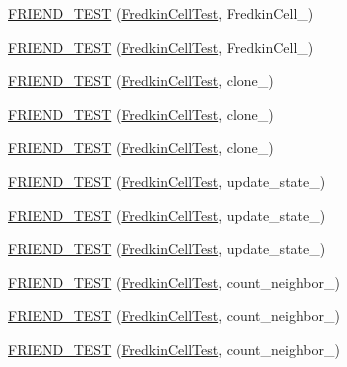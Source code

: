 \begin{DoxyCompactItemize}
\item 
\hyperlink{classFredkinCell_a909e7a7909a653da223ed24b3904273e}{F\-R\-I\-E\-N\-D\-\_\-\-T\-E\-S\-T} (\hyperlink{classFredkinCell_aef267ce10e0a76047d409a41033eea05}{Fredkin\-Cell\-Test}, Fredkin\-Cell\-\_)
\item 
\hyperlink{classFredkinCell_a1dd337d9a2ce520930532f1e68fa50a8}{F\-R\-I\-E\-N\-D\-\_\-\-T\-E\-S\-T} (\hyperlink{classFredkinCell_aef267ce10e0a76047d409a41033eea05}{Fredkin\-Cell\-Test}, Fredkin\-Cell\-\_)
\item 
\hyperlink{classFredkinCell_a048958e9309e0809bd04d64f61d280a9}{F\-R\-I\-E\-N\-D\-\_\-\-T\-E\-S\-T} (\hyperlink{classFredkinCell_aef267ce10e0a76047d409a41033eea05}{Fredkin\-Cell\-Test}, clone\-\_)
\item 
\hyperlink{classFredkinCell_abb791a3d2a9804051dc980c138972d9c}{F\-R\-I\-E\-N\-D\-\_\-\-T\-E\-S\-T} (\hyperlink{classFredkinCell_aef267ce10e0a76047d409a41033eea05}{Fredkin\-Cell\-Test}, clone\-\_)
\item 
\hyperlink{classFredkinCell_aa974fb8ada85bb63c2f82e8252ce0f1a}{F\-R\-I\-E\-N\-D\-\_\-\-T\-E\-S\-T} (\hyperlink{classFredkinCell_aef267ce10e0a76047d409a41033eea05}{Fredkin\-Cell\-Test}, clone\-\_)
\item 
\hyperlink{classFredkinCell_aa6acd05ad181ce29318c07cd9b479a5d}{F\-R\-I\-E\-N\-D\-\_\-\-T\-E\-S\-T} (\hyperlink{classFredkinCell_aef267ce10e0a76047d409a41033eea05}{Fredkin\-Cell\-Test}, update\-\_\-state\-\_)
\item 
\hyperlink{classFredkinCell_a225569bf0b6e9c688c5b312316d6fbdb}{F\-R\-I\-E\-N\-D\-\_\-\-T\-E\-S\-T} (\hyperlink{classFredkinCell_aef267ce10e0a76047d409a41033eea05}{Fredkin\-Cell\-Test}, update\-\_\-state\-\_)
\item 
\hyperlink{classFredkinCell_aa1a224054e453e4250fadd1562849d48}{F\-R\-I\-E\-N\-D\-\_\-\-T\-E\-S\-T} (\hyperlink{classFredkinCell_aef267ce10e0a76047d409a41033eea05}{Fredkin\-Cell\-Test}, update\-\_\-state\-\_)
\item 
\hyperlink{classFredkinCell_abd74a8b6a7c4d11c4661d645af8e59ff}{F\-R\-I\-E\-N\-D\-\_\-\-T\-E\-S\-T} (\hyperlink{classFredkinCell_aef267ce10e0a76047d409a41033eea05}{Fredkin\-Cell\-Test}, count\-\_\-neighbor\-\_)
\item 
\hyperlink{classFredkinCell_a1e4c587da05f0ca6c1818f075e9945a1}{F\-R\-I\-E\-N\-D\-\_\-\-T\-E\-S\-T} (\hyperlink{classFredkinCell_aef267ce10e0a76047d409a41033eea05}{Fredkin\-Cell\-Test}, count\-\_\-neighbor\-\_)
\item 
\hyperlink{classFredkinCell_a61d5b57533cc8211a427f48acfe7755a}{F\-R\-I\-E\-N\-D\-\_\-\-T\-E\-S\-T} (\hyperlink{classFredkinCell_aef267ce10e0a76047d409a41033eea05}{Fredkin\-Cell\-Test}, count\-\_\-neighbor\-\_)

\end{DoxyCompactItemize}
